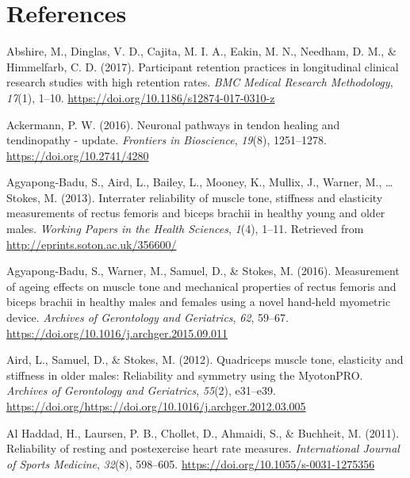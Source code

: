 \documentclass[
  english,
  man,floatsintext]{apa6}
\begin{document}
\clearpage

\hypertarget{references}{%
\section{References}\label{references}}

\setlength{\parindent}{-0.5in}
\setlength{\leftskip}{0.5in}

\hypertarget{refs}{}
\leavevmode\hypertarget{ref-Abshire2017}{}%
Abshire, M., Dinglas, V. D., Cajita, M. I. A., Eakin, M. N., Needham, D. M., \& Himmelfarb, C. D. (2017). Participant retention practices in longitudinal clinical research studies with high retention rates. \emph{BMC Medical Research Methodology}, \emph{17}(1), 1--10. \url{https://doi.org/10.1186/s12874-017-0310-z}

\leavevmode\hypertarget{ref-AckermannPaul2016}{}%
Ackermann, P. W. (2016). Neuronal pathways in tendon healing and tendinopathy - update. \emph{Frontiers in Bioscience}, \emph{19}(8), 1251--1278. \url{https://doi.org/10.2741/4280}

\leavevmode\hypertarget{ref-Agyapong-Badu2013}{}%
Agyapong-Badu, S., Aird, L., Bailey, L., Mooney, K., Mullix, J., Warner, M., \ldots{} Stokes, M. (2013). Interrater reliability of muscle tone, stiffness and elasticity measurements of rectus femoris and biceps brachii in healthy young and older males. \emph{Working Papers in the Health Sciences}, \emph{1}(4), 1--11. Retrieved from \url{http://eprints.soton.ac.uk/356600/}

\leavevmode\hypertarget{ref-Agyapong-Badu2016}{}%
Agyapong-Badu, S., Warner, M., Samuel, D., \& Stokes, M. (2016). Measurement of ageing effects on muscle tone and mechanical properties of rectus femoris and biceps brachii in healthy males and females using a novel hand-held myometric device. \emph{Archives of Gerontology and Geriatrics}, \emph{62}, 59--67. \url{https://doi.org/10.1016/j.archger.2015.09.011}

\leavevmode\hypertarget{ref-Aird2012}{}%
Aird, L., Samuel, D., \& Stokes, M. (2012). Quadriceps muscle tone, elasticity and stiffness in older males: Reliability and symmetry using the MyotonPRO. \emph{Archives of Gerontology and Geriatrics}, \emph{55}(2), e31--e39. \url{https://doi.org/https://doi.org/10.1016/j.archger.2012.03.005}

\leavevmode\hypertarget{ref-AlHaddad2011}{}%
Al Haddad, H., Laursen, P. B., Chollet, D., Ahmaidi, S., \& Buchheit, M. (2011). Reliability of resting and postexercise heart rate measures. \emph{International Journal of Sports Medicine}, \emph{32}(8), 598--605. \url{https://doi.org/10.1055/s-0031-1275356}
\end{document}
